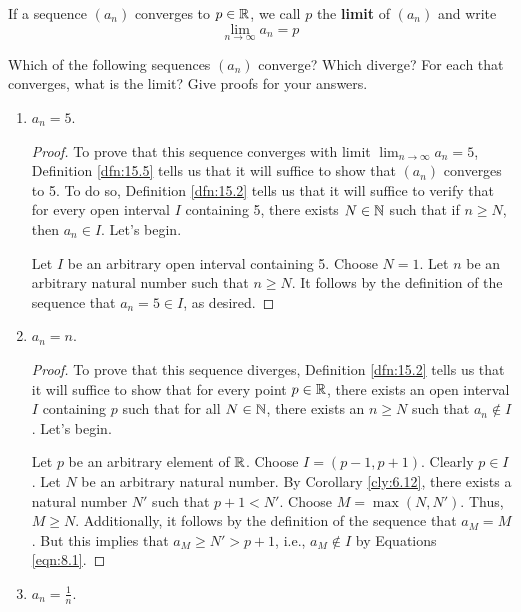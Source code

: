 \documentclass[../main.tex]{subfiles}
\begin{document}
\begin{definition}\label{dfn:15.5}
    If a sequence $(a_n)$ converges to $p\in\mathbb{R}$, we call $p$ the \textbf{limit} of $(a_n)$ and write
    \begin{equation*}
        \lim_{n\to\infty}a_n = p
    \end{equation*}
\end{definition}

\begin{exercise}\label{exr:15.6}
    Which of the following sequences $(a_n)$ converge? Which diverge? For each that converges, what is the limit? Give proofs for your answers.
    \begin{enumerate}[label={(\alph*)},ref={\theexercise\alph*}]
        \item \label{exr:15.6a}$a_n=5$.
        \begin{proof}
            To prove that this sequence converges with limit $\lim_{n\to\infty}a_n=5$, Definition \ref{dfn:15.5} tells us that it will suffice to show that $(a_n)$ converges to 5. To do so, Definition \ref{dfn:15.2} tells us that it will suffice to verify that for every open interval $I$ containing 5, there exists $N\in\mathbb{N}$ such that if $n\geq N$, then $a_n\in I$. Let's begin.\par
            Let $I$ be an arbitrary open interval containing 5. Choose $N=1$. Let $n$ be an arbitrary natural number such that $n\geq N$. It follows by the definition of the sequence that $a_n=5\in I$, as desired.
        \end{proof}
        \item \label{exr:15.6b}$a_n=n$.
        \begin{proof}
            To prove that this sequence diverges, Definition \ref{dfn:15.2} tells us that it will suffice to show that for every point $p\in\mathbb{R}$, there exists an open interval $I$ containing $p$ such that for all $N\in\mathbb{N}$, there exists an $n\geq N$ such that $a_n\notin I$. Let's begin.\par
            Let $p$ be an arbitrary element of $\mathbb{R}$. Choose $I=(p-1,p+1)$. Clearly $p\in I$. Let $N$ be an arbitrary natural number. By Corollary \ref{cly:6.12}, there exists a natural number $N'$ such that $p+1<N'$. Choose $M=\max(N,N')$. Thus, $M\geq N$. Additionally, it follows by the definition of the sequence that $a_M=M$. But this implies that $a_M\geq N'>p+1$, i.e., $a_M\notin I$ by Equations \ref{eqn:8.1}.
        \end{proof}
        \item \label{exr:15.6c}$a_n=\frac{1}{n}$.

\end{enumerate}
\end{exercise}
\end{document}

